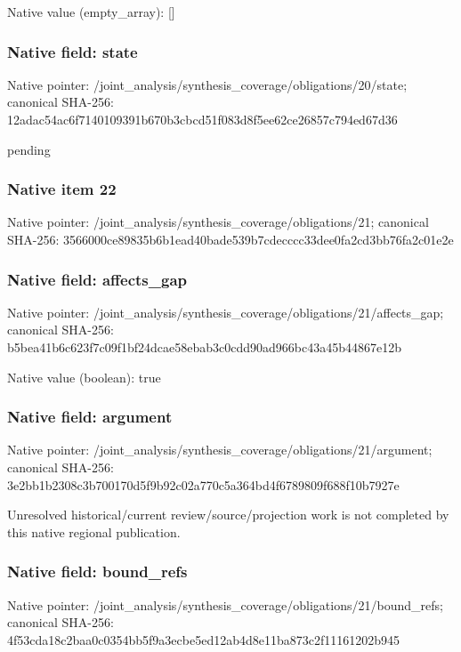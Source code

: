 \documentclass[10pt,a4paper]{article}
\begin{document}
Native value (empty\_\allowbreak{}array): []

\subsubsection{Native field: state}
Native pointer: /joint\_\allowbreak{}analysis/synthesis\_\allowbreak{}coverage/obligations/20/state; canonical SHA-256: 12adac54ac6f7140109391b670b3cbcd51f083d8f5ee62ce26857c794ed67d36

\begingroup\raggedright\sloppy pending\par\endgroup

\subsubsection{Native item 22}
Native pointer: /joint\_\allowbreak{}analysis/synthesis\_\allowbreak{}coverage/obligations/21; canonical SHA-256: 3566000ce89835b6b1ead40bade539b7cdecccc33dee0fa2cd3bb76fa2c01e2e

\subsubsection{Native field: affects\_\allowbreak{}gap}
Native pointer: /joint\_\allowbreak{}analysis/synthesis\_\allowbreak{}coverage/obligations/21/affects\_\allowbreak{}gap; canonical SHA-256: b5bea41b6c623f7c09f1bf24dcae58ebab3c0cdd90ad966bc43a45b44867e12b

Native value (boolean): true

\subsubsection{Native field: argument}
Native pointer: /joint\_\allowbreak{}analysis/synthesis\_\allowbreak{}coverage/obligations/21/argument; canonical SHA-256: 3e2bb1b2308c3b700170d5f9b92c02a770c5a364bd4f6789809f688f10b7927e

\begingroup\raggedright\sloppy Unresolved historical/\allowbreak{}current review/\allowbreak{}source/\allowbreak{}projection work is not completed by this native regional publication.\par\endgroup

\subsubsection{Native field: bound\_\allowbreak{}refs}
Native pointer: /joint\_\allowbreak{}analysis/synthesis\_\allowbreak{}coverage/obligations/21/bound\_\allowbreak{}refs; canonical SHA-256: 4f53cda18c2baa0c0354bb5f9a3ecbe5ed12ab4d8e11ba873c2f11161202b945
\end{document}
